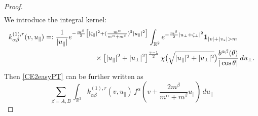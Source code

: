 \documentclass[reqno]{amsart}
\numberwithin{equation}{section}
\numberwithin{equation}{section}
\begin{document}
\begin{proof}
\begin{align}
		\end{align}
		We introduce the integral kernel:
		\begin{align}
			k_{\alpha \beta}^{(1),r}(v,u_{\parallel}) &=:  \frac{1}{|u_{\parallel}|} e^{-\frac{m^\beta}{2}\big[|\zeta_{\parallel}|^2+(\frac{m^\alpha}{m^\alpha+m^\beta})^2|u_{\parallel}|^2\big]} \int_{\mathbb{R}^2} e^{-\frac{m^\beta}{2}|u_{\perp} + \zeta_{\perp}|^2} \mathbf{1}_{|v|+|v_*|>m}\notag\\
			&\hspace{2.5cm}\times  \left[|u_{\parallel}|^2 + |u_{\perp}|^2\right]^{\frac{\gamma - 1}{2}} \chi\big(\sqrt{|u_{\parallel}|^2 + |u_{\perp}|^2}\big) \frac{b^{ \alpha \beta}(\theta)}{|\cos \theta|} \, du_{\perp}.\label{ker1rrr}
		\end{align}
		Then \eqref{CE2easyPT} can be further written as
		\begin{equation*}
		\sum_{\beta=A,B}	\int_{\mathbb{R}^3}k_{\alpha \beta}^{(1),r}(v,u_{\parallel})\,f^\alpha(v + \frac{2m^{\beta}}{m^{\alpha}+m^{\beta}}u_{\parallel}) \,d u_{\parallel}
		\end{equation*}
		

\end{proof}
\end{document}

